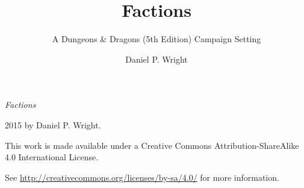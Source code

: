 \documentclass[10pt,twoside,openright,a4paper,twocolumn]{book}
\title{Factions}
\subtitle{A Dungeons \& Dragons (5th Edition) Campaign Setting}
\author{Daniel P. Wright}
\begin{document}

\begin{titlingpage}
\factionstitle
\end{titlingpage}

\frontmatter
{}

\onecolumn
\thispagestyle{empty}
\null\vfill
\begin{flushleft}
\textit{Factions}

{\textcopyright} 2015 by Daniel P. Wright.

\bigskip

{\ccLogo} {\ccAttribution} {\ccShareAlike}

This work is made available under a Creative Commons Attribution-ShareAlike 4.0 International License.

See \url{http://creativecommons.org/licenses/by-sa/4.0/} for more information.
\end{flushleft}
\twocolumn

\cleardoublepage

\tableofcontents

\thispagestyle{empty}

\mainmatter
\end{document}
